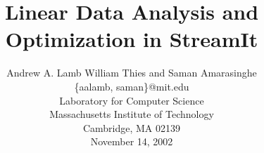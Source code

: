 \documentclass{sig-alternate}
\title{Linear Data Analysis and Optimization in StreamIt}
\author{
\alignauthor \vspace{-18pt}
Andrew A. Lamb
William Thies
and Saman Amarasinghe\\
	\vspace{8pt}
	\{aalamb, saman\}@mit.edu \\
	\vspace{8pt}
	Laboratory for Computer Science \\
	Massachusetts Institute of Technology \\
	Cambridge, MA  02139 \\
	\vspace{8pt}
        November 14, 2002}
\begin{document}
\newtheorem{definition}{Definition}

\maketitle

\newcommand{\mt}[1]{\mbox{\it #1}}

\begin{abstract}

\end{abstract}












\clearpage

\appendix

\end{document}
